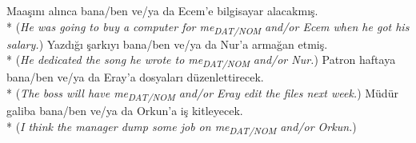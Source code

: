 \ex Maa\c{s}{\i}n{\i} al{\i}nca bana/ben ve/ya da Ecem'e bilgisayar alacakm{\i}\c{s}. \\*
({\it He was going to buy a computer for me\textsubscript{DAT/NOM} and/or Ecem when he got his salary.})
\ex Yazd{\i}\u{g}{\i} \c{s}ark{\i}y{\i} bana/ben ve/ya da Nur'a arma\u{g}an etmi\c{s}. \\*
({\it He dedicated the song he wrote to me\textsubscript{DAT/NOM} and/or Nur.})
\ex Patron haftaya bana/ben ve/ya da Eray'a dosyalar{\i} d\"{u}zenlettirecek. \\*
({\it The boss will have me\textsubscript{DAT/NOM} and/or Eray edit the files next week.})
\ex M\"{u}d\"{u}r galiba bana/ben ve/ya da Orkun'a i\c{s} kitleyecek. \\*
({\it I think the manager dump some job on me\textsubscript{DAT/NOM} and/or Orkun.})
\z
